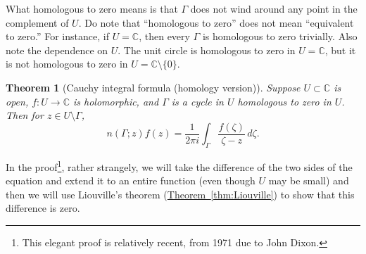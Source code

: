 \documentclass[12pt,openany]{book}
\newcommand{\C}{{\mathbb{C}}}
\newcommand{\myquote}[1]{``#1''}
\theoremstyle{plain}
\newtheorem{thm}{Theorem}[section]
\theoremstyle{remark}
\theoremstyle{definition}
\theoremstyle{exercise}
\theoremstyle{example}
\newcommand{\thmref}[1]{\hyperref[#1]{Theorem~\ref*{#1}}}
\begin{document}
What homologous to zero means is that $\Gamma$ does not wind around any
point in the complement of $U$.
Do note that \myquote{homologous to zero} does not mean
\myquote{equivalent to zero.}
For instance, if $U = \C$, then every $\Gamma$ is homologous to zero trivially.
Also note the dependence on $U$.  The unit circle is homologous to zero in
$U = \C$, but it is not homologous to zero in $U = \C \setminus \{ 0 \}$.

\begin{thm}[Cauchy integral formula (homology version)]
\label{thm:CIFhomology}
Suppose $U \subset \C$ is open, $f \colon U \to \C$ is holomorphic, and
$\Gamma$ is
a cycle
in $U$
homologous to zero in $U$.
Then for $z \in U \setminus \Gamma$,
\begin{equation*}
n(\Gamma;z)
f(z)
=
\frac{1}{2\pi i}
\int_{\Gamma}
\frac{f(\zeta)}{\zeta-z}
\,
d \zeta .
\end{equation*}
\end{thm}

In the proof\footnote{%
This elegant proof is relatively recent, from 1971 due to John Dixon.},
rather strangely, we will take the difference of the two
sides of the equation and extend it to an entire
function (even though $U$ may be small) and then we will use
Liouville's theorem (\thmref{thm:Liouville}) to show that this difference is
zero.
\end{document}
